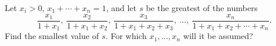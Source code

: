 Let $x_i > 0$, $x_1 + \cdots + x_n = 1$, and let $s$ be the greatest of the numbers
\[ \frac{x_1}{1 + x_1},\ \frac{x_2}{1 + x_1 + x_2},\ \frac{x_3}{1 + x_1 + x_2 + x_3},\ \ldots,\ \frac{x_n}{1 + x_1 + x_2 + \cdots + x_n}. \]
Find the smallest value of $s$. For which $x_1, \ldots, x_n$ will it be assumed?
